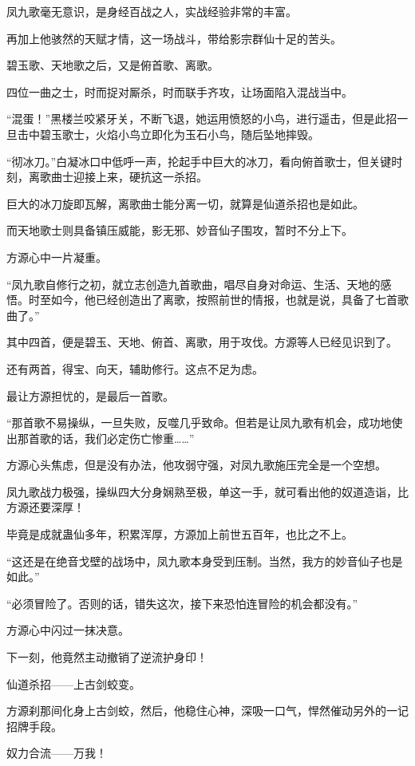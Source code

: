 \begin{this_body}
凤九歌毫无意识，是身经百战之人，实战经验非常的丰富。

再加上他骇然的天赋才情，这一场战斗，带给影宗群仙十足的苦头。

碧玉歌、天地歌之后，又是俯首歌、离歌。

四位一曲之士，时而捉对厮杀，时而联手齐攻，让场面陷入混战当中。

“混蛋！”黑楼兰咬紧牙关，不断飞退，她运用愤怒的小鸟，进行遥击，但是此招一旦击中碧玉歌士，火焰小鸟立即化为玉石小鸟，随后坠地摔毁。

“彻冰刀。”白凝冰口中低呼一声，抡起手中巨大的冰刀，看向俯首歌士，但关键时刻，离歌曲士迎接上来，硬抗这一杀招。

巨大的冰刀旋即瓦解，离歌曲士能分离一切，就算是仙道杀招也是如此。

而天地歌士则具备镇压威能，影无邪、妙音仙子围攻，暂时不分上下。

方源心中一片凝重。

“凤九歌自修行之初，就立志创造九首歌曲，唱尽自身对命运、生活、天地的感悟。时至如今，他已经创造出了离歌，按照前世的情报，也就是说，具备了七首歌曲了。”

其中四首，便是碧玉、天地、俯首、离歌，用于攻伐。方源等人已经见识到了。

还有两首，得宝、向天，辅助修行。这点不足为虑。

最让方源担忧的，是最后一首歌。

“那首歌不易操纵，一旦失败，反噬几乎致命。但若是让凤九歌有机会，成功地使出那首歌的话，我们必定伤亡惨重……”

方源心头焦虑，但是没有办法，他攻弱守强，对凤九歌施压完全是一个空想。

凤九歌战力极强，操纵四大分身娴熟至极，单这一手，就可看出他的奴道造诣，比方源还要深厚！

毕竟是成就蛊仙多年，积累浑厚，方源加上前世五百年，也比之不上。

“这还是在绝音戈壁的战场中，凤九歌本身受到压制。当然，我方的妙音仙子也是如此。”

“必须冒险了。否则的话，错失这次，接下来恐怕连冒险的机会都没有。”

方源心中闪过一抹决意。

下一刻，他竟然主动撤销了逆流护身印！

仙道杀招——上古剑蛟变。

方源刹那间化身上古剑蛟，然后，他稳住心神，深吸一口气，悍然催动另外的一记招牌手段。

奴力合流——万我！


\end{this_body}
